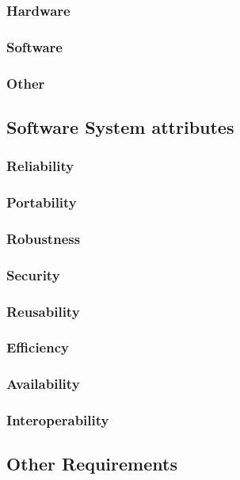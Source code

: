 \documentclass[english]{article}
\begin{document}
				 \subsubsection{Hardware}
				
				 \subsubsection{Software}
			
				 \subsubsection{Other}
				
					
									\newpage
				\subsection{Software System attributes}
				
				\subsubsection{Reliability}
    			
    				
				\subsubsection{Portability}
 
    				
				\subsubsection{Robustness}
    		
    				
				\subsubsection{Security}
    			
    				
				\subsubsection{Reusability}
	
				    
				\subsubsection{Efficiency}
				  
				\subsubsection{Availability}
				 
	
				\subsubsection{Interoperability}
				

				\subsection{Other Requirements}
				

	
\end{document}
